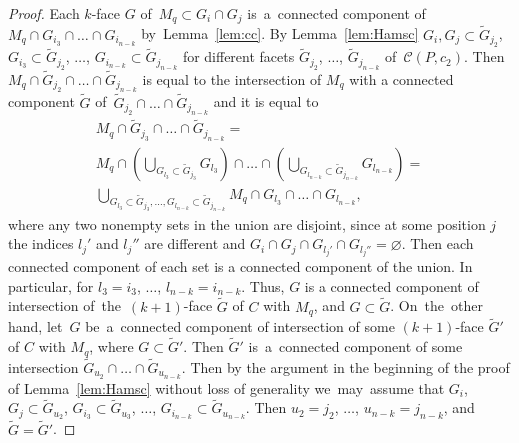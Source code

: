 \documentclass[12pt]{amsart}
\theoremstyle{definition}
\theoremstyle{remark}
\begin{document}
\begin{proof}
Each $k$-face $G$ of~$M_q\subset G_i\cap G_j$ is~a~connected component 
of~$M_q\cap G_{i_3}\cap\dots \cap G_{i_{n-k}}$ by~Lemma~\ref{lem:cc}. 
By Lemma~\ref{lem:Hamsc} $G_i, G_j\subset\widetilde{G}_{j_2}$, $G_{i_3}\subset \widetilde{G}_{j_2}$,
$\dots$, $G_{i_{n-k}}\subset \widetilde{G}_{j_{n-k}}$ for different facets $\widetilde{G}_{j_2}$, $\dots$, $\widetilde{G}_{j_{n-k}}$
of~$\mathcal{C}(P,c_2)$. %
Then $M_q\cap \widetilde{G}_{j_2}\cap \dots\cap \widetilde{G}_{j_{n-k}}$ is equal to
the intersection of $M_q$ with a connected component $\widetilde{G}$ 
of~$\widetilde{G}_{j_2}\cap \dots\cap \widetilde{G}_{j_{n-k}}$
and it is equal to
\begin{gather*}
M_q\cap \widetilde{G}_{j_3}\cap \dots\cap \widetilde{G}_{j_{n-k}}=\\
M_q\cap\left(\bigcup\limits_{G_{l_3}\subset \widetilde{G}_{j_3}}G_{l_3}\right)\cap\dots\cap
\left(\bigcup\limits_{G_{l_{n-k}}\subset \widetilde{G}_{j_{n-k}}}G_{l_{n-k}}\right) =\\
\bigcup\limits_{G_{l_3}\subset \widetilde{G}_{j_3},\dots, G_{l_{n-k}}\subset \widetilde{G}_{j_{n-k}}}M_q\cap G_{l_3}\cap\dots\cap
G_{l_{n-k}}, 
\end{gather*}
where any two nonempty sets in the union are disjoint, since at some position $j$ the indices $l_j'$ and $l_j''$ are different
and $G_i\cap G_j\cap G_{l_j'}\cap G_{l_j''}=\varnothing$. Then each connected component of each set is a connected component of the union. In particular, for $l_3=i_3$, $\dots$, $l_{n-k}=i_{n-k}$. Thus, $G$ is a connected component of
intersection of~the~$(k+1)$-face $\widetilde{G}$ of $C$ with $M_q$, and $G\subset \widetilde{G}$.
On~the~other hand, let~$G$ be~a~connected component of intersection of some $(k+1)$-face $\widetilde{G}'$ of $C$ with $M_q$,
where $G\subset \widetilde{G}'$. Then $\widetilde{G}'$ is~a~connected component of some intersection
$\widetilde{G}_{u_2}\cap \dots\cap\widetilde{G}_{u_{n-k}}$. Then by the argument in the beginning 
of the proof of Lemma~\ref{lem:Hamsc} without loss of generality we~may~assume that
$G_i$, $G_j\subset \widetilde{G}_{u_2}$, $G_{i_3}\subset  \widetilde{G}_{u_3}$, $\dots$, 
$G_{i_{n-k}}\subset  \widetilde{G}_{u_{n-k}}$. Then $u_2=j_2$, $\dots$, $u_{n-k}=j_{n-k}$, and $\widetilde{G}=\widetilde{G}'$.
\end{proof}
\end{document}

